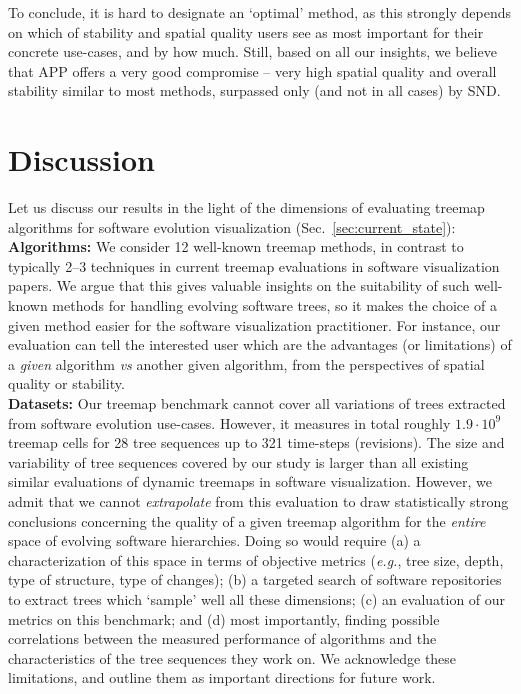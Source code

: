 To conclude, it is hard to designate an `optimal' method, as this strongly depends on which of stability and spatial quality users see as most important for their concrete use-cases, and by how much. Still, based on all our insights, we believe that APP offers a very good compromise -- very high spatial quality and overall stability similar to most methods, surpassed only (and not in all cases) by SND.


\section{Discussion}
\label{sec:init-discussion}
%
%
Let us discuss our results in the light of the dimensions of evaluating treemap algorithms for software evolution visualization (Sec.~\ref{sec:current_state}):\\

\noindent\textbf{Algorithms:} We consider 12 well-known treemap methods, in contrast to typically 2--3 techniques in current treemap evaluations in software visualization papers. We argue that this gives valuable insights on the suitability of such well-known methods for handling evolving software trees, so it makes the choice of a given method easier for the software visualization practitioner. For instance, our evaluation can tell the interested user which are the advantages (or limitations) of a \emph{given} algorithm \emph{vs} another given algorithm, from the perspectives of spatial quality or stability.\\

\noindent\textbf{Datasets:} Our treemap benchmark cannot cover all variations of trees extracted from software evolution use-cases. However, it measures in total roughly $1.9 \cdot 10^{9}$ treemap cells for 28 tree sequences up to 321 time-steps (revisions). The size and variability of tree sequences covered by our study is larger than all existing similar evaluations of dynamic treemaps in software visualization. However, we admit that we cannot \emph{extrapolate} from this evaluation to draw statistically strong conclusions concerning the quality of a given treemap algorithm for the \emph{entire} space of evolving software hierarchies. Doing so would require (a) a characterization of this space in terms of objective metrics (\emph{e.g.}, tree size, depth, type of structure, type of changes); (b) a targeted search of software repositories to extract trees which `sample' well all these dimensions; (c) an evaluation of our metrics on this benchmark; and (d) most importantly, finding possible correlations between the measured performance of algorithms and the characteristics of the tree sequences they work on. We acknowledge these limitations, and outline them as important directions for future work.\\

